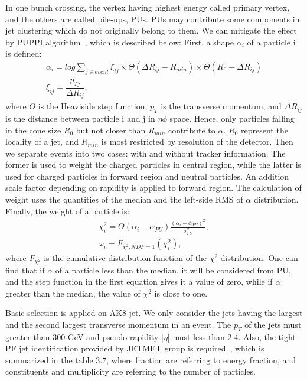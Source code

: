 In one bunch crossing, the vertex having highest energy called primary vertex, and the others are called pile-ups, PUs. PUs may contribute some components in jet clustering which do not originally belong to them. We can mitigate the effect by PUPPI algorithm~\citep{puppi}, which is described below:
First, a shape $\alpha _{i}$ of a particle i is defined: 
\begin{equation} \label{eq2}
\begin{split}
\alpha_i = log \sum\limits_{j\in event} \xi _{ij} \times \Theta(\Delta R_{ij} - R_{min}) \times \Theta(R_0 - \Delta R_{ij}) \\
\xi _{ij} = \dfrac{p_{Tj}}{\Delta R_{ij}}, 
\end{split}
\end{equation}
where $\Theta$ is the Heaviside step function, $p_{T}$ is the transverse momentum, and $\Delta R_{ij}$ is the distance between particle i and j in $\eta \phi$ space. Hence, only particles falling in the cone size $R_0$ but not closer than $R_{min}$ contribute to $\alpha $. $R_0$ represent the locality of a jet, and $R_{min}$ is most restricted by resolution of the detector. Then we separate events into two cases: with and without tracker information. The former is used to weight the charged particles in central region, while the latter is used for charged particles in forward region and neutral particles. An addition scale factor depending on rapidity is applied to forward region. The calculation of weight uses the quantities of the median and the left-side RMS of $\alpha $ distribution. Finally, the weight of a particle is: 
\begin{equation} \label{eq3}
\begin{split}
\chi ^2_{i} = \Theta(\alpha _i - \bar{\alpha } _{PU}) \frac{ ( \alpha _i - \bar{\alpha } _{PU})^2 }{\sigma ^2 _{PU}} , \\
\omega _i = F_{\chi ^2,NDF=1}(\chi ^2_i), 
\end{split}
\end{equation}
where $F_{\chi ^2}$ is the cumulative distribution function of the $\chi ^2$ distribution. One can find that if $\alpha $ of a particle less than the median, it will be considered from PU, and the step function in the first equation gives it a value of zero, while if $\alpha $ greater than the median, the value of $\chi  ^2$ is close to one. 

Basic selection is applied on AK8 jet. We only consider the jets having the largest and the second largest transverse momentum in an event. The $p_{T}$ of the jets must greater than 300 GeV and pseudo rapidity |$\eta$| must less than 2.4. Also, the tight PF jet identification provided by JETMET group is required~\citep{JetID13TeVTWiki}, which is summarized in the table 3.7, where fraction are referring to energy fraction, and constituents and multiplicity are referring to the number of particles.


